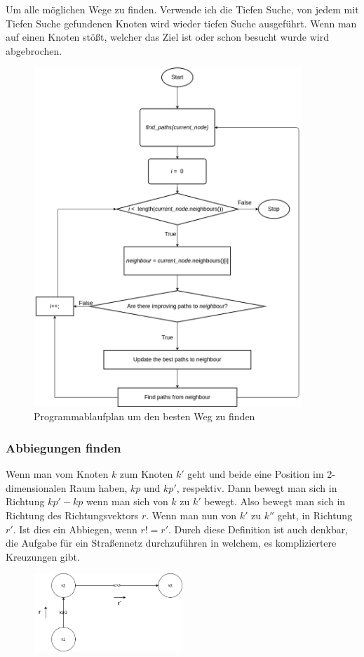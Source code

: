 \documentclass[a4paper,12pt,arial]{scrartcl}
\begin{document}
\par
Um alle möglichen Wege zu finden. Verwende ich die Tiefen Suche, von jedem mit Tiefen Suche gefundenen Knoten wird wieder tiefen Suche ausgeführt.
Wenn man auf einen Knoten stößt, welcher das Ziel ist oder schon besucht wurde wird abgebrochen.
\newpage
\begin{figure}[h]
    \centering
    \includegraphics[width=0.9\textwidth]{images/pap_find_path_v4.png}
    \caption{Programmablaufplan um den besten Weg zu finden}
    \label{fig:pap3}
\end{figure}

\newpage
\subsubsection{Abbiegungen finden}
Wenn man vom Knoten $k$ zum Knoten $k'$ geht und beide eine Position im 2-dimensionalen Raum haben, $kp$ und $kp'$, respektiv.
Dann bewegt man sich in Richtung $kp'-kp$ wenn man sich von  $k$ zu $k'$ bewegt. Also bewegt man sich in Richtung des Richtungsvektors $r$. Wenn man nun von $k'$ zu $k''$ geht, in Richtung $r'$.
Ist dies ein Abbiegen, wenn $r != r'$.
Durch diese Definition ist auch denkbar, die Aufgabe für ein Straßennetz durchzuführen in welchem, es kompliziertere Kreuzungen gibt.
\begin{figure}
    \centering
    \includegraphics[width=0.5\textwidth]{AbbiegenBWinf.png}
    \caption{}
    \label{fig:abbiegen}
\end{figure}
\end{document}
